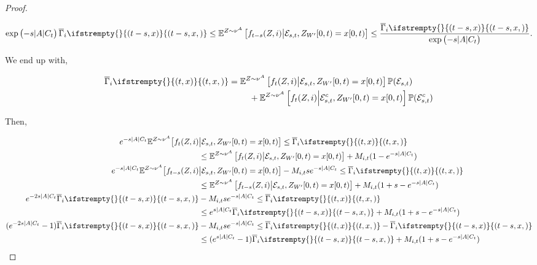 \documentclass[12pt]{article}
\newcommand{\mb}{\mathbb}
\newcommand{\mc}{\mathcal}
\newcommand{\ov}{\overline}
\newcommand{\pr}{\mb{P}}							%
\newcommand{\exmu}[2]{\mb{E}^{#1}\left[#2\right]}	%
\newcommand{\xf}{x}									%
\newcommand{\vind}[1]{_{#1}}						%
\newcommand{\tmi}[1]{#1}							%
\newcommand{\vpara}[1]{^{#1}}						%
\newcommand{\stpara}[1]{_{#1}}						%
\newcommand{\tpara}[1]{_{#1}}						%
\newcommand{\jumpbd}[1]{C_{#1}}						%
\newcommand{\tmepro}[3]{
\ifstrempty{#3}{
	(#1,#2)}{
	(#1,#2,#3)}}									%
\newcommand{\evnt}{\mc{E}}						%
\newcommand{\ratee}{\Gamma}							%
\newcommand{\grate}{\ov{\ratee}}					%
\newcommand{\mm}{\nu}								%
\newcommand{\const}{M}								%
\newcommand{\sttpara}[2]{_{#1,#2}}					%
\newcommand{\tspara}[2]{_{#1,#2}}					%
\newcommand{\Xh}{Z}									%
\begin{document}
\begin{proof}
\begin{itemize}
\begin{equation}
\exp\left(-s|A|\jumpbd{t}\right)\grate\stpara{i}\tmepro{t-s}{\xf}{} \leq \exmu{\Xh \sim\mm\vpara{A}}{f\tpara{t-s}(\Xh,i)\middle|\evnt\tspara{s}{t},\Xh\vind{W'}\tmi{[0,t)} = \xf\tmi{[0,t)}} \leq \frac{\grate\stpara{i}\tmepro{t-s}{\xf}{}}{\exp\left(-s|A|\jumpbd{t}\right)}.
\label{Ex::cdbd}
\end{equation}
\end{itemize}

We end up with,

\begin{align*}
\grate\stpara{i}\tmepro{t}{\xf}{} &= \exmu{\Xh \sim\mm\vpara{A}}{f\tpara{t}(\Xh,i)\middle|\evnt\tspara{s}{t},\Xh\vind{W'}\tmi{[0,t)} = \xf\tmi{[0,t)}}\pr(\evnt\tspara{s}{t})\\
&\hspace{24 pt} + \exmu{\Xh \sim\mm\vpara{A}}{f\tpara{t}(\Xh,i)\middle|\evnt\tspara{s}{t}^c,\Xh\vind{W'}\tmi{[0,t)} = \xf\tmi{[0,t)}}\pr(\evnt\tspara{s}{t}^c)
\end{align*}

Then,

\begin{align*}
e^{-s|A|\jumpbd{t}}\mb{E}^{\Xh \sim\mm\vpara{A}}\big[f\tpara{t}(\Xh,i)&\big|\evnt\tspara{s}{t},\Xh\vind{W'}\tmi{[0,t)} = \xf\tmi{[0,t)}\big] \leq \grate\stpara{i}\tmepro{t}{\xf}{} \\
&\leq \exmu{\Xh \sim\mm\vpara{A}}{f\tpara{t}(\Xh,i)\middle|\evnt\tspara{s}{t},\Xh\vind{W'}\tmi{[0,t)} = \xf\tmi{[0,t)}} + \const\sttpara{i}{t}(1 - e^{-s|A|\jumpbd{t}})\\
e^{-s|A|\jumpbd{t}}\mb{E}^{\Xh \sim\mm\vpara{A}}\big[f\tpara{t-s}(\Xh,i)&\big|\evnt\tspara{s}{t},\Xh\vind{W'}\tmi{[0,t)} = \xf\tmi{[0,t)}\big] - \const\sttpara{i}{t}se^{-s|A|\jumpbd{t}} \leq \grate\stpara{i}\tmepro{t}{\xf}{}\\
&\leq \exmu{\Xh \sim\mm\vpara{A}}{f\tpara{t-s}(\Xh,i)\middle|\evnt\tspara{s}{t},\Xh\vind{W'}\tmi{[0,t)} = \xf\tmi{[0,t)}} + \const\sttpara{i}{t}(1 + s - e^{-s|A|\jumpbd{t}})\\
e^{-2s|A|\jumpbd{t}}\grate\stpara{i}\tmepro{t-s}{\xf}{} &- \const\sttpara{i}{t}se^{-s|A|\jumpbd{t}} \leq \grate\stpara{i}\tmepro{t}{\xf}{}\\
&\leq e^{s|A|\jumpbd{t}}\grate\stpara{i}\tmepro{t-s}{\xf}{}+ \const\sttpara{i}{t}(1 + s - e^{-s|A|\jumpbd{t}})\\
(e^{-2s|A|\jumpbd{t}}-1)\grate\stpara{i}\tmepro{t-s}{\xf}{} &- \const\sttpara{i}{t}se^{-s|A|\jumpbd{t}} \leq \grate\stpara{i}\tmepro{t}{\xf}{} - \grate\stpara{i}\tmepro{t-s}{\xf}{}\\
&\leq (e^{s|A|\jumpbd{t}}-1)\grate\stpara{i}\tmepro{t-s}{\xf}{}+ \const\sttpara{i}{t}(1 + s - e^{-s|A|\jumpbd{t}})\\
\end{align*}


\end{proof}
\end{document}
